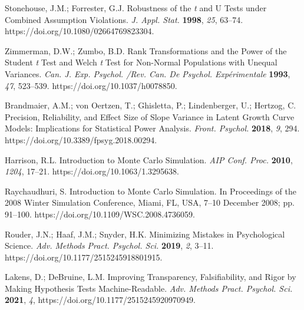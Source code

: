 \documentclass[psych,tutorial,accept,moreauthors,pdftex]{Definitions/mdpi}
\begin{document}
\begin{thebibliography}{999}
Stonehouse, J.M.; Forrester, G.J. Robustness of the \emph{t} and U Tests under Combined Assumption Violations. \emph{J. Appl. Stat.} \textbf{1998}, \emph{25}, 63--74. https://doi.org/10.1080/02664769823304.

Zimmerman, D.W.; Zumbo, B.D. Rank Transformations and the Power of the Student \emph{t} Test and Welch \emph{t} Test for Non-Normal Populations with Unequal Variances. \emph{Can. J. Exp. Psychol. /Rev. Can. De Psychol. Expérimentale} \textbf{1993}, \emph{47}, 523--539. https://doi.org/10.1037/h0078850.

Brandmaier, A.M.; von Oertzen, T.; Ghisletta, P.; Lindenberger, U.; Hertzog, C. Precision, Reliability, and Effect Size of Slope Variance in Latent Growth Curve Models: Implications for Statistical Power Analysis. \emph{Front. Psychol.} \textbf{2018}, \emph{9}, 294. https://doi.org/10.3389/fpsyg.2018.00294.


Harrison, R.L. Introduction to Monte Carlo Simulation. \emph{AIP Conf. Proc.} \textbf{2010}, \emph{1204}, 17--21. https://doi.org/10.1063/1.3295638.


Raychaudhuri, S. Introduction to Monte Carlo Simulation. In Proceedings of the 2008 Winter Simulation Conference, Miami, FL, USA, 7--10 December 2008; pp. 91--100. https://doi.org/10.1109/WSC.2008.4736059.


Rouder, J.N.; Haaf, J.M.; Snyder, H.K. Minimizing Mistakes in Psychological Science. \emph{Adv. Methods Pract. Psychol. Sci.} \textbf{2019}, \emph{2}, 3--11. https://doi.org/10.1177/2515245918801915.


Lakens, D.; DeBruine, L.M. Improving Transparency, Falsifiability, and Rigor by Making Hypothesis Tests Machine-Readable. \emph{Adv. Methods Pract. Psychol. Sci.} \textbf{2021}, \emph{4}, https://doi.org/10.1177/2515245920970949.



\end{thebibliography}
\end{document}
